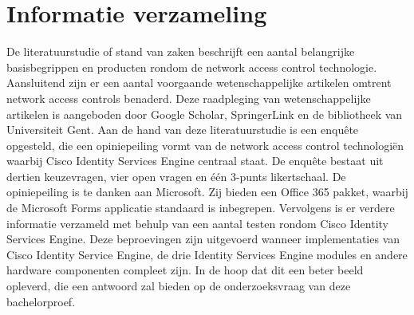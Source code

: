 \section{Informatie verzameling}
De literatuurstudie of stand van zaken beschrijft een aantal belangrijke basisbegrippen en producten rondom de network access control technologie. Aansluitend zijn er een aantal voorgaande wetenschappelijke artikelen omtrent network access controls benaderd. Deze raadpleging van wetenschappelijke artikelen is aangeboden door Google Scholar, SpringerLink en de bibliotheek van Universiteit Gent.
\newline
\newline
Aan de hand van deze literatuurstudie is een enquête opgesteld, die een opiniepeiling vormt van de network access control technologiën waarbij Cisco Identity Services Engine centraal staat. De enquête bestaat uit dertien keuzevragen, vier open vragen en één 3-punts likertschaal. De opiniepeiling is te danken aan Microsoft. Zij bieden een Office 365 pakket, waarbij de Microsoft Forms applicatie standaard is inbegrepen. \newline \newline
Vervolgens is er verdere informatie verzameld met behulp van een aantal testen rondom Cisco Identity Services Engine. Deze beproevingen zijn uitgevoerd wanneer implementaties van Cisco Identity Service Engine, de drie Identity Services Engine modules en andere hardware componenten compleet zijn. In de hoop dat dit een beter beeld opleverd, die een antwoord zal bieden op de onderzoeksvraag van deze bachelorproef. 

